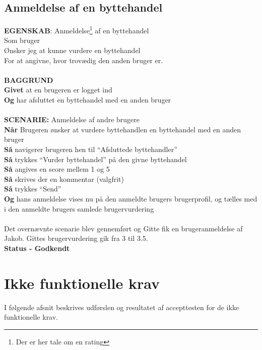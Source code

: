 \subsection{Anmeldelse af en byttehandel}
{\color{blue}\textbf{EGENSKAB}:} Anmeldelse\footnote{Der er her tale om en rating} af en byttehandel \\
Som bruger \\
Ønsker jeg at kunne vurdere en byttehandel \\
For at angivne, hvor trovædig den anden bruger er.\\ \\
{\color{blue}\textbf{BAGGRUND}} \\
{\color{blue}\textbf{Givet}} at en brugeren er logget ind \\
{\color{blue}\textbf{Og}} har afsluttet en byttehandel med en anden bruger\\\\
{\color{blue}\textbf{SCENARIE:}} Anmeldelse af andre brugere \\
{\color{blue}\textbf{Når}} Brugeren ønsker at vurdere byttehandlen en byttehandel med en anden bruger\\
{\color{blue}\textbf{Så}} navigerer brugeren hen til “Afsluttede byttehandler”\\
{\color{blue}\textbf{Så}} trykkes “Vurder byttehandel” på den givne byttehandel\\
{\color{blue}\textbf{Så}} angives en score mellem 1 og 5\\
{\color{blue}\textbf{Så}} skrives der en kommentar (valgfrit)\\
{\color{blue}\textbf{Så}} trykkes “Send”\\
{\color{blue}\textbf{Og}} hans anmeldelse vises nu på den anmeldte brugers brugerprofil, og tælles med i den anmeldte brugers samlede brugervurdering \\ \\
Det overnævnte scenarie blev gennemført og Gitte fik en brugeranmeldelse af Jakob. Gittes brugervurdering gik fra 3 til 3.5. \\
\textbf{Status - Godkendt}

\section{Ikke funktionelle krav}
I følgende afsnit beskrives udførslen og resultatet af accepttesten for de ikke funktionelle krav.

